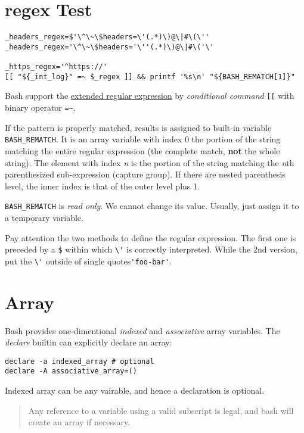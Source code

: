 \section{regex Test}
\label{sec:bash-regex-test}

\begin{lstlisting}
_headers_regex=$'\^\~\$headers=\'(.*)\)@\|#\(\''
_headers_regex='\^\~\$headers='\''(.*)\)@\|#\('\'

_https_regex='^https://'
[[ "${_int_log}" =~ $_regex ]] && printf '%s\n' "${BASH_REMATCH[1]}"
\end{lstlisting}

Bash support the
\href{http://mywiki.wooledge.org/RegularExpression}{extended
  regular expression} by \textit{conditional command} \verb|[[|
with binary operator \verb|=~|.

If the pattern is properly matched, results is assigned to
built-in variable \lstinline|BASH_REMATCH|. It is an array
variable with index 0 the portion of the string matching the
entire regular expression (the complete match, \textbf{not} the
whole string). The element with index \textit{n} is the portion of
the string matching the \textit{n}th parenthesized sub-expression
(capture group). If there are nested parenthesis level, the inner
index is that of the outer level plus 1.

\lstinline|BASH_REMATCH| is \textit{read only}. We cannot change
its value. Usually, just assign it to a temporary variable.

Pay attention the two methods to define the regular
expression. The first one is preceded by a
\verb|$| within which \verb|\'| is correctly interpreted. While
the 2nd version, put the \verb|\'| outside of single
quotes\verb|'foo-bar'|.

\section{Array}
\label{sec:bash-array}

Bash provides one-dimentional \textit{indexed} and
\textit{associative} array variables. The \textit{declare} builtin
can explicitly declare an array:

\begin{lstlisting}
declare -a indexed_array # optional
declare -A associative_array=()
\end{lstlisting}

Indexed array can be any vairable, and hence a declaration is
optional.

\begin{quotation}
  Any reference to a variable using a valid subscript is legal,
  and bash will create an array if necessary.
\end{quotation}

